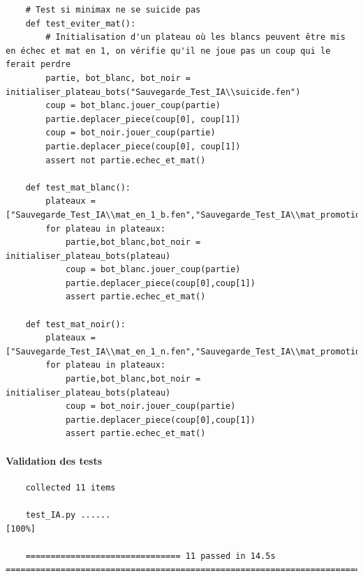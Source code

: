 \documentclass{article}
\begin{document}
\begin{verbatim}
    # Test si minimax ne se suicide pas 
    def test_eviter_mat():
        # Initialisation d'un plateau où les blancs peuvent être mis en échec et mat en 1, on vérifie qu'il ne joue pas un coup qui le ferait perdre
        partie, bot_blanc, bot_noir = initialiser_plateau_bots("Sauvegarde_Test_IA\\suicide.fen")
        coup = bot_blanc.jouer_coup(partie)
        partie.deplacer_piece(coup[0], coup[1])
        coup = bot_noir.jouer_coup(partie)
        partie.deplacer_piece(coup[0], coup[1])
        assert not partie.echec_et_mat()   
    
    def test_mat_blanc():
        plateaux = ["Sauvegarde_Test_IA\\mat_en_1_b.fen","Sauvegarde_Test_IA\\mat_promotion_b.fen"]
        for plateau in plateaux:
            partie,bot_blanc,bot_noir = initialiser_plateau_bots(plateau)
            coup = bot_blanc.jouer_coup(partie)
            partie.deplacer_piece(coup[0],coup[1])
            assert partie.echec_et_mat()
    
    def test_mat_noir():
        plateaux = ["Sauvegarde_Test_IA\\mat_en_1_n.fen","Sauvegarde_Test_IA\\mat_promotion_n.fen"]
        for plateau in plateaux:
            partie,bot_blanc,bot_noir = initialiser_plateau_bots(plateau)
            coup = bot_noir.jouer_coup(partie)
            partie.deplacer_piece(coup[0],coup[1])
            assert partie.echec_et_mat()

\end{verbatim}

\paragraph{Validation des tests}

\begin{verbatim}
    collected 11 items
    
    test_IA.py ......                                                                                                                                                  [100%]
    
    =============================== 11 passed in 14.5s ============================================================================= 
\end{verbatim}
\end{document}
